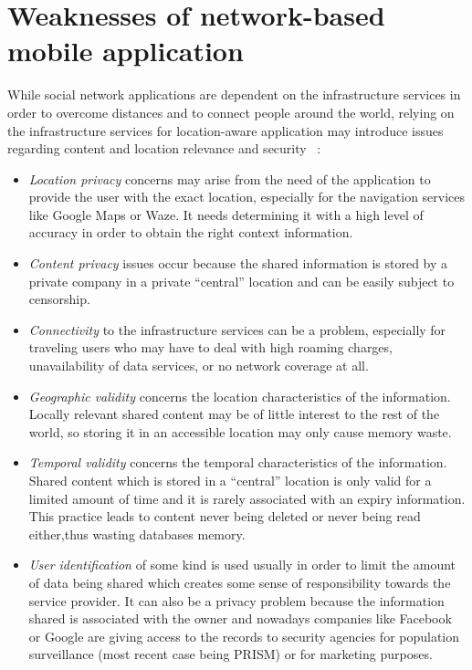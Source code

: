 \section{Weaknesses of network-based mobile application}
While social network applications are dependent on the infrastructure services
in order to overcome distances and to connect people around the world, relying
on the infrastructure services for location-aware application may introduce
issues regarding content and location relevance and security
~\cite{percomfloatingcontent}:
\begin{itemize}
\item {\it Location privacy} concerns may arise from the need of the application
to provide the user with the exact location, especially for the navigation
services like Google Maps or Waze. It needs determining it with a high level of
accuracy in order to obtain the right context information.
\item {\it Content privacy} issues occur because the shared information is
stored by a private company in a private ``central'' location and can be easily
subject to censorship.
\item {\it Connectivity} to the infrastructure services can be a problem,
especially for traveling users who may have to deal with high roaming charges, 
unavailability of data services, or no network coverage at all.
\item {\it Geographic validity} concerns the location characteristics of the
information. Locally relevant shared content may be of little interest to the
rest of the world, so storing it in an accessible location may only cause memory
waste.
\item {\it Temporal validity} concerns the temporal characteristics of the
information. Shared content which is stored in a ``central'' location is only
valid for a limited amount of time and it is rarely associated with an expiry
information. This practice leads to content never being deleted or never being
read either,thus wasting databases memory.
\item {\it User identification} of some kind is used usually in order to limit
the amount of data being shared which creates some sense of responsibility
towards the service provider. It can also be a privacy problem because the
information shared is associated with the owner and nowadays companies like
Facebook or Google are giving access to the records to security agencies for
population surveillance (most recent case being PRISM) or for marketing
purposes.
\end{itemize}

